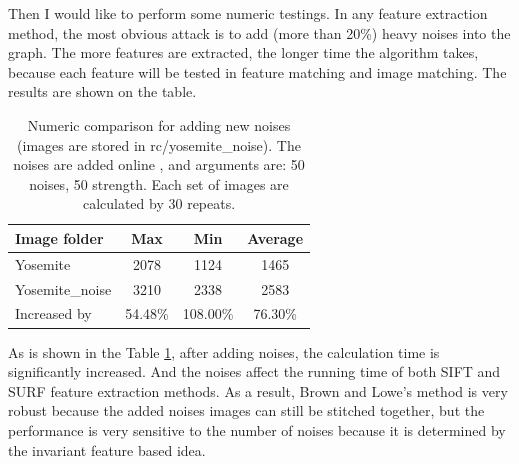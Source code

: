 \documentclass[10pt,twocolumn,letterpaper]{article}
\begin{document}
Then I would like to perform some numeric testings.
In any feature extraction method, the most obvious attack is to add (more than 20\%) heavy noises into the graph.
The more features are extracted, the longer time the algorithm takes, because each feature will be tested in feature matching and image matching.
The results are shown on the table.

\begin{table}
\begin{center}
\begin{tabular}{|l|c|c|c|}
\hline
Image folder & Max & Min & Average \\
\hline\hline
Yosemite & 2078 & 1124 & 1465 \\
Yosemite\_noise & 3210 & 2338 & 2583 \\
Increased by & 54.48\% & 108.00\% & 76.30\% \\
\hline
\end{tabular}
\end{center}
\caption{Numeric comparison for adding new noises (images are stored in rc/yosemite\_noise). The noises are added online \cite{noise}, and arguments are: 50 noises, 50 strength. Each set of images are calculated by 30 repeats.}
\label{t1}
\end{table}

As is shown in the Table \ref{t1}, after adding noises, the calculation time is significantly increased.
And the noises affect the running time of both SIFT and SURF feature extraction methods.
As a result, Brown and Lowe's method is very robust because the added noises images can still be stitched together,
but the performance is very sensitive to the number of noises because it is determined by the invariant feature based idea.
\end{document}
